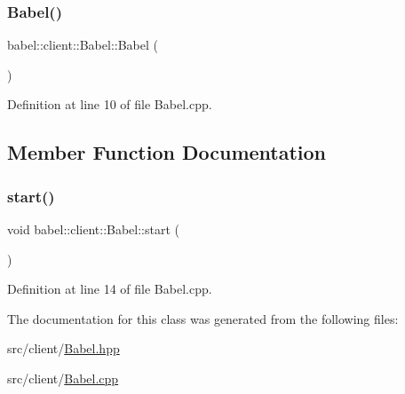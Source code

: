 \subsubsection{\texorpdfstring{Babel()}{Babel()}}
{\footnotesize\ttfamily babel\+::client\+::\+Babel\+::\+Babel (\begin{DoxyParamCaption}{ }\end{DoxyParamCaption})}



Definition at line 10 of file Babel.\+cpp.



\subsection{Member Function Documentation}
\mbox{\label{classbabel_1_1client_1_1_babel_aaa3a5814ad0b6a85aacce4dae8db95f8}} 
\subsubsection{\texorpdfstring{start()}{start()}}
{\footnotesize\ttfamily void babel\+::client\+::\+Babel\+::start (\begin{DoxyParamCaption}{ }\end{DoxyParamCaption})}



Definition at line 14 of file Babel.\+cpp.



The documentation for this class was generated from the following files\+:\begin{DoxyCompactItemize}
\item 
src/client/\mbox{\hyperlink{_babel_8hpp}{Babel.\+hpp}}\item 
src/client/\mbox{\hyperlink{_babel_8cpp}{Babel.\+cpp}}\end{DoxyCompactItemize}
